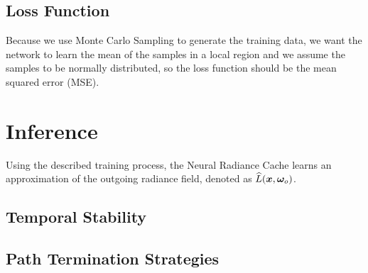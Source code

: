 \subsection{Loss Function}
Because we use Monte Carlo Sampling to generate the training data, we want the network to learn the mean of the samples in a local region and we assume the samples to be normally distributed, so the loss function should be the mean squared error (MSE).

\section{Inference}
Using the described training process, the Neural Radiance Cache learns an approximation of the outgoing radiance field, denoted as $\widehat{L}(\bm{x}, \bm{\omega}_o)$.

\subsection{Temporal Stability}

\subsection{Path Termination Strategies}
